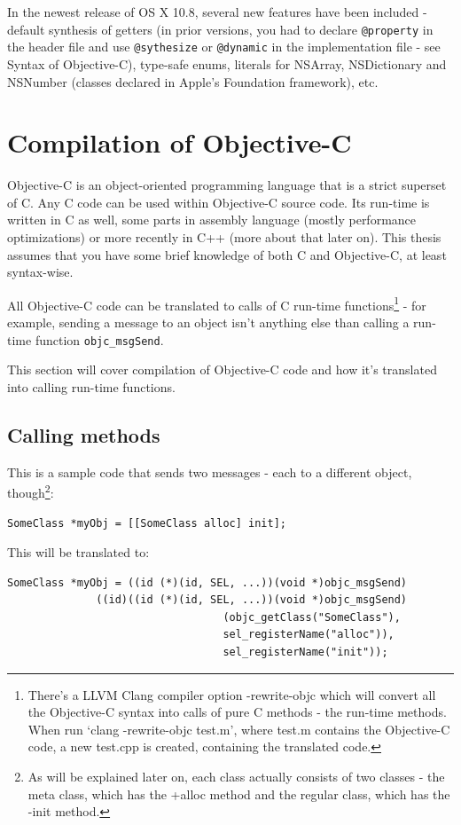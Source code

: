 \documentclass[a4paper, 11pt, fleqn]{book}
\begin{document}
In the newest release of OS X 10.8, several new features have been included - default synthesis of getters (in prior versions, you had to declare \verb=@property= in the header file and use \verb=@sythesize= or \verb=@dynamic= in the implementation file - see Syntax of Objective-C), type-safe enums, literals for NSArray, NSDictionary and NSNumber (classes declared in Apple's Foundation framework), etc.

\section{Compilation of Objective-C}

Objective-C is an object-oriented programming language that is a strict superset of C. Any C code can be used within Objective-C source code. Its run-time is written in C as well, some parts in assembly language (mostly performance optimizations) or more recently in C++ (more about that later on). This thesis assumes that you have some brief knowledge of both C and Objective-C, at least syntax-wise.

All Objective-C code can be translated to calls of C run-time functions\footnote{There's a LLVM Clang compiler option -rewrite-objc which will convert all the Objective-C syntax into calls of pure C methods - the run-time methods. When run `clang -rewrite-objc test.m', where test.m contains the Objective-C code, a new test.cpp is created, containing the translated code.} - for example, sending a message to an object isn't anything else than calling a run-time function \verb=objc_msgSend=.

This section will cover compilation of Objective-C code and how it's translated into calling run-time functions.

\subsection{Calling methods}

This is a sample code that sends two messages - each to a different object, though\footnote{As will be explained later on, each class actually consists of two classes - the meta class, which has the +alloc method and the regular class, which has the -init method.}:
\begin{verbatim}SomeClass *myObj = [[SomeClass alloc] init];\end{verbatim}

This will be translated to:
\begin{verbatim}SomeClass *myObj = ((id (*)(id, SEL, ...))(void *)objc_msgSend)
              ((id)((id (*)(id, SEL, ...))(void *)objc_msgSend)
                                  (objc_getClass("SomeClass"),
                                  sel_registerName("alloc")), 
                                  sel_registerName("init"));
\end{verbatim}
\end{document}
